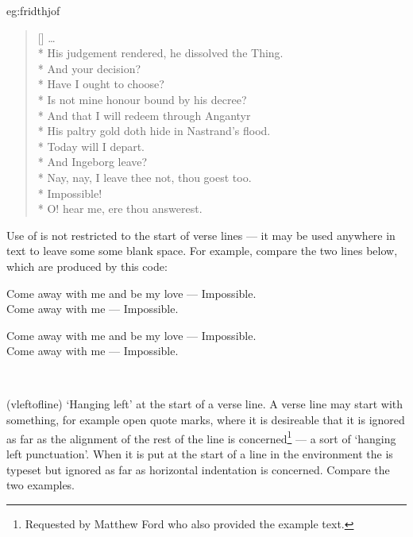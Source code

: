 \begin{egresult}{eg:fridthjof}%
\settowidth{\versewidth}{Nay, nay, I leave thee not, 
                         thou goest too}%
\begin{verse}[\versewidth]
\ldots{} \\*
His judgement rendered, he dissolved the Thing. \\*
 And your decision? \\*
  
                      Have I ought to choose? \\*
Is not mine honour bound by his decree? \\*
And that I will redeem through Angantyr \\*
His paltry gold doth hide in Nastrand's flood. \\*
Today will I depart. \\*
  
                      And Ingeborg leave? \\*
 Nay, nay, I leave thee not, 
                      thou goest too. \\*
 Impossible! \\*
  
                       O! hear me, ere thou answerest.
\end{verse}
\end{egresult}

    Use of \cmd{\vinphantom} is not restricted to the start of verse lines ---
it may be used anywhere in text to leave some some 
blank space.
For example, compare the two lines below, which are produced by this code:
\begin{lcode}
   \noindent Come away with me and be my love --- Impossible. \\
Come away with me  --- Impossible.
\end{lcode}
\noindent Come away with me and be my love --- Impossible. \\
          Come away with me  --- Impossible.

\begin{syntax}
\cmd{\vleftofline} \\
\end{syntax}
\glossary(vleftofline)%
  {}%
  {`Hanging left'  at the start of a verse line.}
A verse line may start with something, for example open quote marks, 
where it is desireable that it is ignored as far as the alignment of the
rest of the line is concerned\footnote{Requested by Matthew 
Ford who also provided the example text.} --- a sort
of `hanging left punctuation'. When it is put at the start of a line
in the  environment the  is typeset but ignored as 
far as horizontal indentation is concerned.
Compare the two examples.

